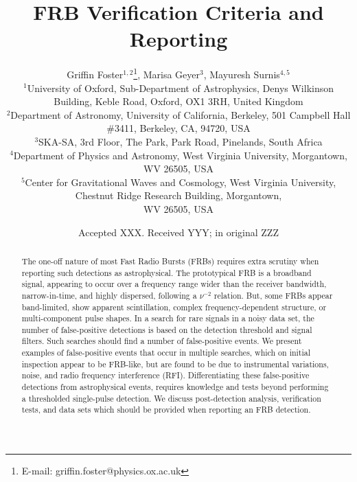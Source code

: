 \documentclass[a4paper,fleqn,usenatbib]{mnras}
\title[FRB Verification Criteria and Reporting]{FRB Verification Criteria and Reporting}
\author[G. Foster et al.]{
Griffin Foster$^{1,2}$\thanks{E-mail: griffin.foster@physics.ox.ac.uk},
Marisa Geyer$^{3}$,
Mayuresh Surnis$^{4,5}$
\\
$^{1}$University of Oxford, Sub-Department of Astrophysics, Denys Wilkinson Building, Keble Road, Oxford, OX1 3RH, United Kingdom\\
$^{2}$Department of Astronomy, University of California, Berkeley, 501 Campbell
Hall \#3411, Berkeley, CA, 94720, USA\\
$^{3}$SKA-SA, 3rd Floor, The Park, Park Road, Pinelands, South Africa\\
$^{4}$Department of Physics and Astronomy, West Virginia University, Morgantown, WV 26505, USA\\
$^{5}$Center for Gravitational Waves and Cosmology, West Virginia University, Chestnut Ridge Research Building, Morgantown,\\ WV 26505, USA\\
}
\date{Accepted XXX. Received YYY; in original ZZZ}
\begin{document}
\label{firstpage}
\pagerange{\pageref{firstpage}--\pageref{lastpage}}
\maketitle



\begin{abstract}
The one-off nature of most Fast Radio Bursts (FRBs) requires extra scrutiny when
reporting such detections as astrophysical.  The prototypical FRB is a broadband
signal, appearing to occur over a frequency range wider than the receiver
bandwidth, narrow-in-time, and highly dispersed, following a $\nu^{-2}$
relation.  But, some FRBs appear band-limited, show apparent scintillation,
complex frequency-dependent structure, or multi-component pulse shapes.  In a
search for rare signals in a noisy data set, the number of false-positive
detections is based on the detection threshold and signal filters.  Such
searches should find a number of false-positive events.  We present examples of
false-positive events that occur in multiple searches, which on initial
inspection appear to be FRB-like, but are found to be due to instrumental
variations, noise, and radio frequency interference (RFI).  Differentiating
these false-positive detections from astrophysical events, requires knowledge
and tests beyond performing a thresholded single-pulse detection.  We discuss
post-detection analysis, verification tests, and data sets which should be
provided when reporting an FRB detection.
\end{abstract}
\end{document}
